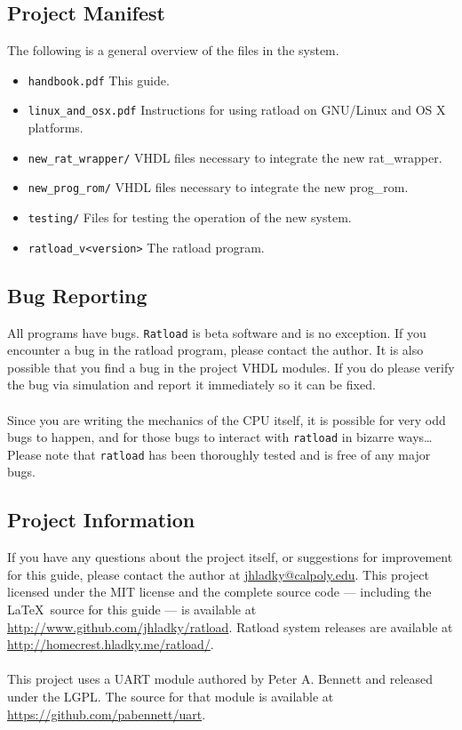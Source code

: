 \documentclass[notitlepage]{article}
\begin{document}
\subsection{Project Manifest}
The following is a general overview of the files in the system.
\begin{itemize}
\item \texttt{handbook.pdf} This guide.
\item \texttt{linux\_and\_osx.pdf} Instructions for using ratload on GNU/Linux and OS X platforms.
\item \texttt{new\_rat\_wrapper/} VHDL files necessary to integrate the new rat\_wrapper.
\item \texttt{new\_prog\_rom/} VHDL files necessary to integrate the new prog\_rom.
\item \texttt{testing/} Files for testing the operation of the new system.
\item \texttt{ratload\_v{\textless}version\textgreater} The ratload program.
\end{itemize}

\subsection{Bug Reporting}
All programs have bugs. \texttt{Ratload} is beta software and is no exception. If you encounter a bug in the ratload program, please contact the author. It is also possible that you find a bug in the project VHDL modules. If you do please verify the bug via simulation and report it immediately so it can be fixed.\\\\
Since you are writing the mechanics of the CPU itself, it is possible for very odd bugs to happen, and for those bugs to interact with \texttt{ratload} in bizarre ways\ldots Please note that \texttt{ratload} has been thoroughly tested and is free of any major bugs.

\subsection{Project Information}
If you have any questions about the project itself, or suggestions for improvement for this guide, please contact the author at \href{mailto:jhladky@calpoly.edu}{jhladky@calpoly.edu}. This project licensed under the MIT license and the complete source code --- including the \LaTeX ~source for this guide --- is available at \url{http://www.github.com/jhladky/ratload}. Ratload system releases are available at \url{http://homecrest.hladky.me/ratload/}.\\\\
This project uses a UART module authored by Peter A. Bennett and released under the LGPL. The source for that module is available at \url{https://github.com/pabennett/uart}.
\end{document}
